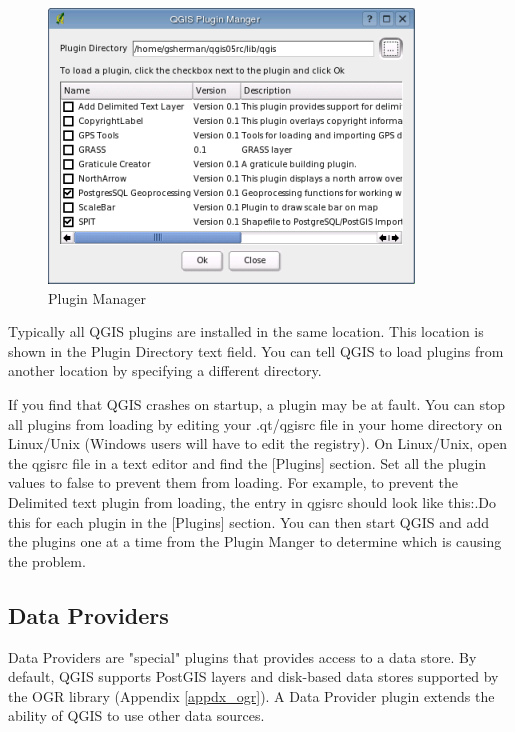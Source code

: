 \documentclass[10pt,english]{article}
\newcommand\qgistip[1]{\raggedright\small{#1}}
\begin{document}
\begin{onehalfspace}
\begin{figure}[h]
   \begin{center}
   \caption{Plugin Manager}\label{fig:pluginmanager}\smallskip
   \includegraphics{qgis_user_guide_images/pluginmanager_80pct}
\end{center}  
\end{figure}
Typically all QGIS plugins are installed in the same location. This location is shown in the Plugin Directory text field. You can tell QGIS to load plugins from another location by specifying a different directory.
\begin{Tip}\caption{\textsc{Crashing Plugins}}
\qgistip{If you find that QGIS crashes on startup, a plugin may be at fault. You can stop all plugins from loading by editing your .qt/qgisrc file in your home directory on Linux/Unix (Windows users will have to edit the registry). On Linux/Unix, open the qgisrc file in a text editor and find the [Plugins] section. Set all the plugin values to false to prevent them from loading. For example, to prevent the Delimited text plugin from loading, the entry in qgisrc should look like this:\ttfamily{
 Add Delimited Text Layer=false}.\normalfont  Do this for each plugin in the [Plugins] section. You can then start QGIS and add the plugins one at a time from the Plugin Manger to determine which is causing the problem.

}
\end{Tip} 

\subsection{Data Providers}
Data Providers are "special" plugins that provides access to a data store. By default, QGIS supports PostGIS layers and disk-based data stores supported by the OGR library (Appendix \ref{appdx_ogr}). A Data Provider plugin extends the ability of QGIS to use other data sources.\\


\end{onehalfspace}
\end{document}
